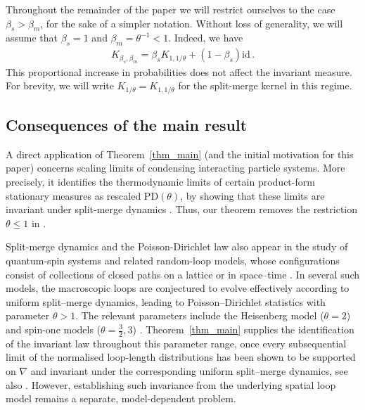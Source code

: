 \documentclass[a4paper,11pt]{article}
\numberwithin{equation}{section}
\begin{document}
Throughout the remainder of the paper we will restrict ourselves to the case $ \beta_{s} > \beta_{m} $, for the sake of a simpler notation. 
Without loss of generality, we will assume that $ \beta_{s} = 1 $ and $ \beta_{m} = \theta^{-1}< 1 $. Indeed, we have 
\begin{equation*}
\begin{aligned}
K_{\beta_s,\beta_m}
=\beta_s K_{1,1/\theta}+ (1-\beta_s)\mathrm{id}\,.
\end{aligned}
\end{equation*}
This proportional increase in probabilities does not affect the invariant measure. For brevity, we will write $ K_{1/ \theta} = K_{1, 1/ \theta} $ for the split-merge kernel in this regime.

\subsection{Consequences of the main result}

A direct application of Theorem~\ref{thm_main} (and the initial motivation for this paper) concerns scaling limits of condensing interacting particle systems. 
More precisely, it identifies the thermodynamic limits of certain product-form stationary measures as rescaled $\mathrm{PD}(\theta)$, by showing that these limits are invariant under split-merge dynamics \cite{ChlebounGabrielGrosskinsky2022}. Thus, our theorem removes the restriction $\theta\leq 1$ in \cite{ChlebounGabrielGrosskinsky2022}.

Split-merge dynamics and the Poisson-Dirichlet law also appear in the study of quantum-spin systems and related random-loop models, whose configurations consist of collections of closed paths on a lattice or in space--time  \cite{GUW2011,BenassiUeltschi2020}.
In several such models, the macroscopic loops are conjectured to evolve effectively according to uniform split--merge dynamics, leading to Poisson--Dirichlet statistics with parameter $\theta>1$.
The relevant parameters include the Heisenberg model ($\theta =2$) \cite{GUW2011}
 and spin-one models ($\theta=\tfrac{3}{2},3$) \cite{CaciEtAl2023}.
Theorem~\ref{thm_main} supplies the identification of the invariant
law throughout this parameter range, once 
every subsequential limit of the normalised loop-length distributions has been shown to be supported on $\nabla$ and invariant under the corresponding uniform split--merge dynamics, see also \cite[Section~4.2]{BenassiUeltschi2020}.
However, establishing such invariance from the underlying spatial loop model remains a separate, model-dependent problem.
\end{document}
